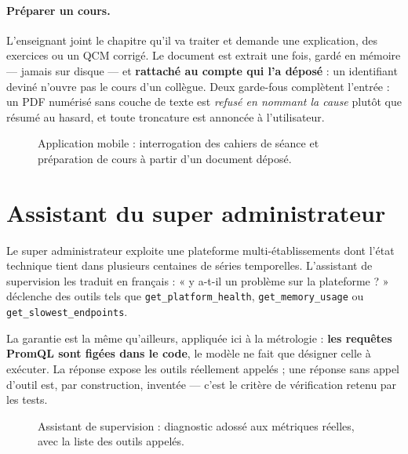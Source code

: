 \paragraph{Préparer un cours.} L'enseignant joint le chapitre qu'il va traiter
et demande une explication, des exercices ou un QCM corrigé. Le document est
extrait une fois, gardé en mémoire — jamais sur disque — et \textbf{rattaché au
compte qui l'a déposé} : un identifiant deviné n'ouvre pas le cours d'un
collègue. Deux garde-fous complètent l'entrée : un PDF numérisé sans couche de
texte est \emph{refusé en nommant la cause} plutôt que résumé au hasard, et
toute troncature est annoncée à l'utilisateur.

\begin{figure}[htbp]
  \centering
  \caption{Application mobile : interrogation des cahiers de séance et
  préparation de cours à partir d'un document déposé.}
  \label{fig:ch4-enseignant}
\end{figure}

\section{Assistant du super administrateur}

Le super administrateur exploite une plateforme multi-établissements dont
l'état technique tient dans plusieurs centaines de séries temporelles.
L'assistant de supervision les traduit en français : « y a-t-il un problème sur
la plateforme ? » déclenche des outils tels que \texttt{get\_platform\_health},
\texttt{get\_memory\_usage} ou \texttt{get\_slowest\_endpoints}.

La garantie est la même qu'ailleurs, appliquée ici à la métrologie :
\textbf{les requêtes PromQL sont figées dans le code}, le modèle ne fait que
désigner celle à exécuter. La réponse expose les outils réellement appelés ;
une réponse sans appel d'outil est, par construction, inventée — c'est le
critère de vérification retenu par les tests.

\begin{figure}[htbp]
  \centering
  \caption{Assistant de supervision : diagnostic adossé aux métriques réelles,
  avec la liste des outils appelés.}
  \label{fig:ch4-supervision}
\end{figure}

